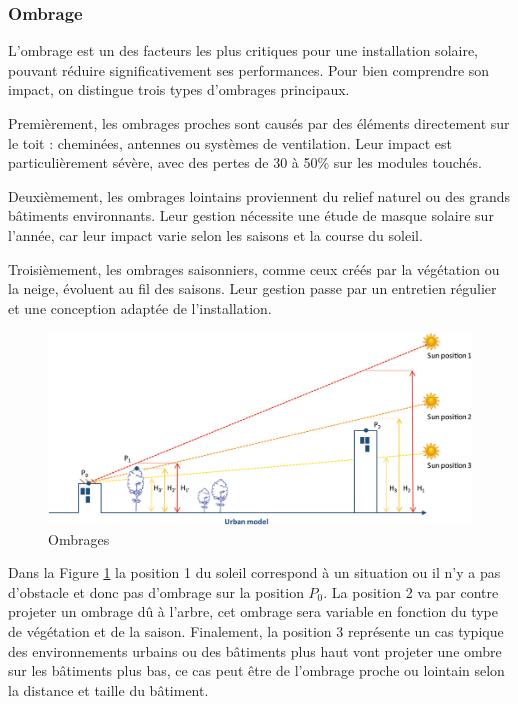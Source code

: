 \subsubsection{Ombrage}
\par{L'ombrage est un des facteurs les plus critiques pour une installation solaire, pouvant réduire significativement ses performances. Pour bien comprendre son impact, on distingue trois types d'ombrages principaux.}

\par{Premièrement, les ombrages proches sont causés par des éléments directement sur le toit : cheminées, antennes ou systèmes de ventilation. Leur impact est particulièrement sévère, avec des pertes de 30 à 50\% sur les modules touchés.}

\par{Deuxièmement, les ombrages lointains proviennent du relief naturel ou des grands bâtiments environnants. Leur gestion nécessite une étude de masque solaire sur l'année, car leur impact varie selon les saisons et la course du soleil.}

\par{Troisièmement, les ombrages saisonniers, comme ceux créés par la végétation ou la neige, évoluent au fil des saisons. Leur gestion passe par un entretien régulier et une conception adaptée de l'installation.}

\begin{figure}[H]
    \centering
    \includegraphics[width=1.00\linewidth]{03-tail//A2_fondamentaux_energie//A2_figures/A2_ombrage.jpg}
    \caption{Ombrages \cite{desthieux_solar_2018}}
    \label{fig:ombrage}
\end{figure}

\par{Dans la Figure \ref{fig:ombrage} la position 1 du soleil correspond à un situation ou il n'y a pas d'obstacle et donc pas d'ombrage sur la position $P_0$. La position 2 va par contre projeter un ombrage dû à l'arbre, cet ombrage sera variable en fonction du type de végétation et de la saison. Finalement, la position 3 représente un cas typique des environnements urbains ou des bâtiments plus haut vont projeter une ombre sur les bâtiments plus bas, ce cas peut être de l'ombrage proche ou lointain selon la distance et taille du bâtiment.}

